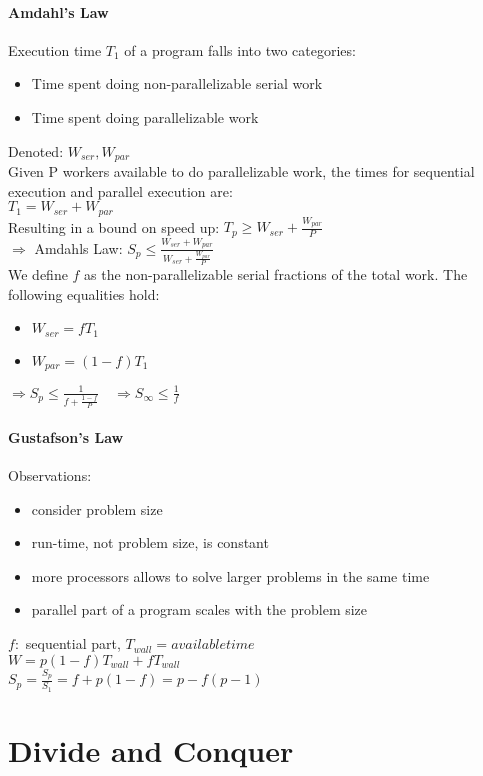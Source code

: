 \documentclass[8pt]{extreport}
\begin{document}
\paragraph{Amdahl's Law} Execution time $T_{1}$ of a program falls into two categories:
\begin{itemize}
\item Time spent doing non-parallelizable serial work
\item Time spent doing parallelizable work
\end{itemize}
Denoted: $W_{ser}, W_{par}$\\
Given P workers available to do parallelizable work, the times for sequential execution and parallel execution are: \\
$T_{1} = W_{ser} + W_{par}$\\
Resulting in a bound on speed up: $T_{p} \geq W_{ser} + \frac{W_{par}}{P}$\\
$\Rightarrow$ Amdahls Law:	$S_{p} \leq \frac{W_{ser}+W_{par}}{W_{ser} + \frac{W_{par}}{P}}$\\
We define $\mathit{f}$ as the non-parallelizable serial fractions of the total work. The following equalities hold:
\begin{itemize}
\item $W_{ser} = \mathit{f}T_{1}$
\item $W_{par} = (1-\mathit{f})T_{1}$
\end{itemize}
$\Rightarrow S_{p} \leq \frac{1}{\mathit{f} + \frac{1-\mathit{f}}{P}} \quad \Rightarrow S_{\infty} \leq \frac{1}{\mathit{f}}$
\paragraph{Gustafson's Law}
Observations:
\begin{itemize}
\item consider problem size
\item run-time, not problem size, is constant
\item more processors allows to solve larger problems in the same time
\item parallel part of a program scales with the problem size
\end{itemize}
$\mathit{f}:$ sequential part, $T_{wall} = available time$ \\
$W = p(1- \mathit{f})T_{wall} + \mathit{f}T_{wall}$\\
$S_{p} = \frac{S_{p}}{S_{1}} = \mathit{f} + p(1-\mathit{f}) = p - \mathit{f}(p-1)$ 
\section{Divide and Conquer}
\end{document}
